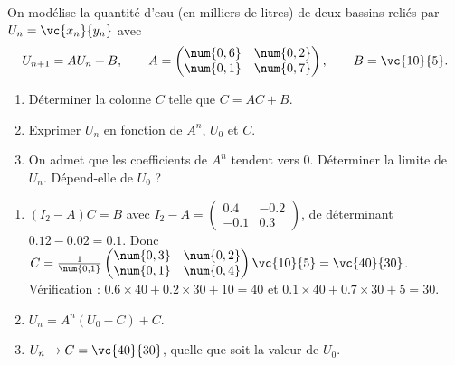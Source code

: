 \begin{exercise}
On modélise la quantité d'eau (en milliers de litres) de deux bassins reliés par $U_n=\vc{x_n}{y_n}$ avec
\[U_{n+1}=AU_n+B,\qquad A=\begin{pmatrix}\num{0,6}&\num{0,2}\\\num{0,1}&\num{0,7}\end{pmatrix},\qquad B=\vc{10}{5}.\]
\begin{enumerate}
\item Déterminer la colonne $C$ telle que $C=AC+B$.
\item Exprimer $U_n$ en fonction de $A^n$, $U_0$ et $C$.
\item On admet que les coefficients de $A^n$ tendent vers $0$. Déterminer la limite de $U_n$. Dépend-elle de $U_0$ ?
\end{enumerate}
\end{exercise}
\begin{solution}
\begin{enumerate}
\item $(I_2-A)C=B$ avec $I_2-A=\begin{pmatrix}\num{0,4}&-\num{0,2}\\-\num{0,1}&\num{0,3}\end{pmatrix}$, de déterminant $\num{0,12}-\num{0,02}=\num{0,1}$. Donc $C=\frac1{\num{0,1}}\begin{pmatrix}\num{0,3}&\num{0,2}\\\num{0,1}&\num{0,4}\end{pmatrix}\vc{10}{5}=\vc{40}{30}$. Vérification : $\num{0,6}\times40+\num{0,2}\times30+10=40$ et $\num{0,1}\times40+\num{0,7}\times30+5=30$.
\item $U_n=A^n(U_0-C)+C$.
\item $U_n\to C=\vc{40}{30}$, quelle que soit la valeur de $U_0$.
\end{enumerate}
\end{solution}

